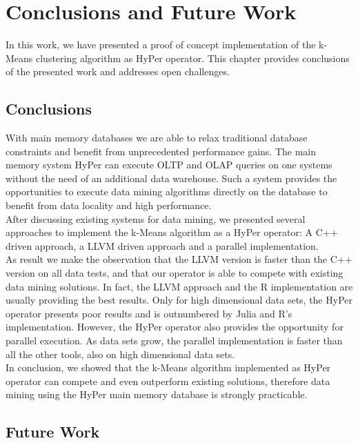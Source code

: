 \chapter{Conclusions and Future Work}\label{chapter:conclusion}
In this work, we have presented a proof of concept implementation of the k-Means clustering algorithm as HyPer operator. This chapter provides conclusions of the presented work and addresses open challenges.

\section{Conclusions}
With main memory databases we are able to relax traditional database constraints and benefit from unprecedented performance gains. The main memory system HyPer can execute OLTP and OLAP queries on one systems without the need of an additional data warehouse. Such a system provides the opportunities to execute data mining algorithms directly on the database to benefit from data locality and high performance.
\\
After discussing existing systems for data mining, we presented several approaches to implement the k-Means algorithm as a HyPer operator: A C++ driven approach, a LLVM driven approach and a parallel implementation.
\\
As result we make the observation that the LLVM version is faster than the C++ version on all data tests, and that our operator is able to compete with existing data mining solutions. In fact, the LLVM approach and the R implementation are usually providing the best results. Only for high dimensional data sets, the HyPer operator presents poor results and is outnumbered by Julia and R's implementation. However, the HyPer operator also provides the opportunity for parallel execution. As data sets grow, the parallel implementation is faster than all the other tools, also on high dimensional data sets.
\\
In conclusion, we showed that the k-Means algorithm implemented as HyPer operator can compete and even outperform existing solutions, therefore data mining using the HyPer main memory database is strongly practicable.

\section{Future Work}

